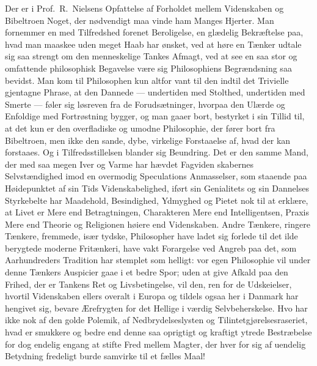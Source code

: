 Der er i Prof.\ R.\ Nielsens Opfattelse af Forholdet mellem
Videnskaben og Bibeltroen Noget, der nødvendigt maa vinde ham Manges
Hjerter. Man fornemmer en med Tilfredshed forenet Beroligelse, en glædelig
Bekræftelse paa, hvad man maaskee uden meget Haab har ønsket, ved at høre en
Tænker udtale sig saa strengt om den menneskelige Tankes Afmagt, ved at see
en saa stor og omfattende philosophisk Begavelse være sig Philosophiens
Begrændsning saa bevidst. Man kom til Philosophen kun altfor vant til den
indtil det Trivielle gjentagne Phrase, at den Dannede --- undertiden med
Stolthed, undertiden med Smerte --- føler sig løsreven fra de
Forudsætninger, hvorpaa den Ulærde og Enfoldige med Fortrøstning bygger, og
man gaaer bort, bestyrket i sin Tillid til, at det kun er den overfladiske og
umodne Philosophie, der fører bort fra Bibeltroen, men ikke den sande, dybe,
virkelige Forstaaelse af, hvad der kan forstaaes. Og i Tilfredsstillelsen
blander sig Beundring. Det er den samme Mand, der med saa megen Iver og Varme
har hævdet Fagviden%
skabernes Selvstændighed imod en overmodig Speculations
Anmasselser, som staaende paa Høidepunktet af sin Tids Videnskabelighed,
iført sin Genialitets og sin Dannelses Styrkebelte har Maadehold,
Besindighed, Ydmyghed og Pietet nok til at erklære, at Livet er Mere end
Betragtningen, Charakteren Mere end Intelligentsen, Praxis Mere end Theorie
og Religionen høiere end Videnskaben. Andre Tænkere, ringere Tænkere,
fremmede, især tydske, Philosopher have ladet sig forlede til det ilde
berygtede moderne Fritænkeri, have vakt Forargelse ved Angreb paa det, som
Aarhundreders Tradition har stemplet som helligt: vor egen Philosophie vil
under denne Tænkers Auspicier gaae i et bedre Spor; uden at give Afkald paa
den Frihed, der er Tankens Ret og Livsbetingelse, vil den, ren for de
Udskeielser, hvortil Videnskaben ellers overalt i Europa og tildels ogsaa her
i Danmark har hengivet sig, bevare Ærefrygten for det Hellige i værdig
Selvbeherskelse. Hvo har ikke nok af den golde Polemik, af
Nedbrydelseslysten og Tilintetgjørelsesraseriet, hvad er smukkere og bedre
end denne saa oprigtigt og kraftigt ytrede Bestræbelse for dog endelig engang
at stifte Fred mellem Magter, der hver for sig af uendelig Betydning
fredeligt burde samvirke til et fælles Maal!

